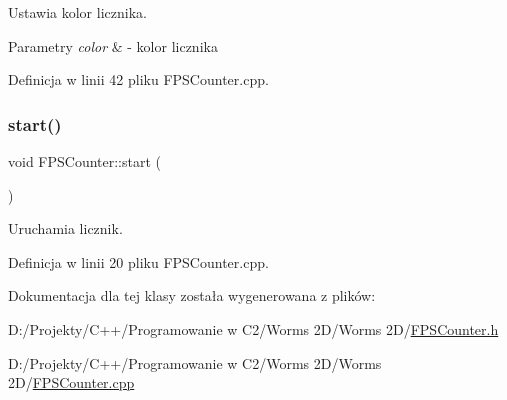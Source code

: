Ustawia kolor licznika. 


\begin{DoxyParams}{Parametry}
{\em color} & -\/ kolor licznika \\
\hline
\end{DoxyParams}


Definicja w linii 42 pliku F\+P\+S\+Counter.\+cpp.

\mbox{\label{class_f_p_s_counter_abba94df2064bfa561ef9d1a3e11929a5}} 
\subsubsection{\texorpdfstring{start()}{start()}}
{\footnotesize\ttfamily void F\+P\+S\+Counter\+::start (\begin{DoxyParamCaption}{ }\end{DoxyParamCaption})}



Uruchamia licznik. 



Definicja w linii 20 pliku F\+P\+S\+Counter.\+cpp.



Dokumentacja dla tej klasy została wygenerowana z plików\+:\begin{DoxyCompactItemize}
\item 
D\+:/\+Projekty/\+C++/\+Programowanie w C2/\+Worms 2\+D/\+Worms 2\+D/\mbox{\hyperlink{_f_p_s_counter_8h}{F\+P\+S\+Counter.\+h}}\item 
D\+:/\+Projekty/\+C++/\+Programowanie w C2/\+Worms 2\+D/\+Worms 2\+D/\mbox{\hyperlink{_f_p_s_counter_8cpp}{F\+P\+S\+Counter.\+cpp}}\end{DoxyCompactItemize}
